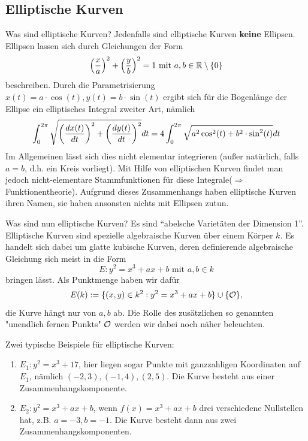 \subsection*{Elliptische Kurven}
Was sind elliptische Kurven? Jedenfalls sind elliptische Kurven \textbf{keine} Ellipsen. 
Ellipsen lassen sich durch Gleichungen der Form
\[ \enbrace*{\frac{x}{a}}^2 + \enbrace*{\frac{y}{b}}^2 = 1 \text{ mit } a,b \in \RR \setminus \setnull \]
beschreiben. 
Durch die Parametrisierung $x(t) = a \cdot \cos(t), y(t) = b \cdot \sin(t)$ ergibt sich für die Bogenlänge der Ellipse ein elliptisches Integral zweiter Art, nämlich
\[ \int_{0}^{2\pi} \sqrt{ \enbrace*{\frac{dx(t)}{dt}}^2 + \enbrace*{\frac{dy(t)}{dt}}^2 } dt = 4 \int_{0}^{2\pi} \sqrt{ a^2 \cos^2(t) + b^2 \cdot \sin^2 (t)} dt \]
Im Allgemeinen lässt sich dies nicht elementar integrieren (außer natürlich, falls $a = b$, d.h. ein Kreis vorliegt). 
Mit Hilfe von elliptischen Kurven findet man jedoch nicht-elementare Stammfunktionen für diese Integrale\linebreak ($\Rightarrow$ Funktionentheorie). 
Aufgrund dieses Zusammenhangs haben elliptische Kurven ihren Namen, sie haben ansonsten nichts mit Ellipsen zutun. 

Was sind nun elliptische Kurven? Es sind \enquote{abelsche Varietäten der Dimension 1}. 
Elliptische Kurven sind spezielle algebraische Kurven über einem Körper $k$. 
Es handelt sich dabei um glatte kubische Kurven, deren definierende algebraische Gleichung sich meist in die Form
\[ E \colon y^2 = x^3 + ax + b \text{ mit } a,b \in k \]
bringen lässt. 
Als Punktmenge haben wir dafür
\[ E(k) := \{ (x,y) \in k^2 : y^2 = x^3 + ax + b\} \cup \{ \oh \}, \]
die Kurve hängt nur von $a,b$ ab. 
Die Rolle des zusätzlichen so genannten "unendlich fernen Punkts" $\oh$ werden wir dabei noch näher beleuchten.

Zwei typische Beispiele für elliptische Kurven:
\begin{enumerate}[1)]
	\item $E_1\colon y^2 = x^3 + 17$, hier liegen sogar Punkte mit ganzzahligen Koordinaten auf $E_1$, nämlich $(-2,3), (-1,4), (2,5)$. 
	Die Kurve besteht aus einer Zusammenhangskomponente.
	\item $E_2 \colon y^2 = x^3 + ax + b$, wenn $f(x) = x^3 + ax + b$ drei verschiedene Nullstellen hat, z.B. $a = -3, b= -1$. 
	Die Kurve besteht dann aus zwei Zusammenhangskomponenten.
\end{enumerate}

